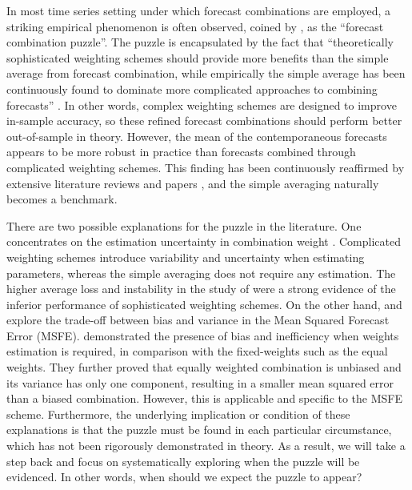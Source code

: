 \documentclass{monashthesis}
\begin{document}
In most time series setting under which forecast combinations are employed, a striking empirical phenomenon is often observed, coined by \textcite{SW04}, as the ``forecast combination puzzle''. The puzzle is encapsulated by the fact that ``theoretically sophisticated weighting schemes should provide more benefits than the simple average from forecast combination, while empirically the simple average has been continuously found to dominate more complicated approaches to combining forecasts'' \autocite{WHLK22}. In other words, complex weighting schemes are designed to improve in-sample accuracy, so these refined forecast combinations should perform better out-of-sample in theory. However, the mean of the contemporaneous forecasts appears to be more robust in practice than forecasts combined through complicated weighting schemes. This finding has been continuously reaffirmed by extensive literature reviews and papers \autocites[e.g.,][]{C89,SW98,SW04,SW09,MSA18,MSA20}, and the simple averaging naturally becomes a benchmark.

There are two possible explanations for the puzzle in the literature. One concentrates on the estimation uncertainty in combination weight \autocite{SW98,SW04,SW09}. Complicated weighting schemes introduce variability and uncertainty when estimating parameters, whereas the simple averaging does not require any estimation. The higher average loss and instability in the study of \textcite{SW04} were a strong evidence of the inferior performance of sophisticated weighting schemes. On the other hand, \textcite{E11} and \textcite{CMVW16} explore the trade-off between bias and variance in the Mean Squared Forecast Error (MSFE). \textcite{CMVW16} demonstrated the presence of bias and inefficiency when weights estimation is required, in comparison with the fixed-weights such as the equal weights. They further proved that equally weighted combination is unbiased and its variance has only one component, resulting in a smaller mean squared error than a biased combination. However, this is applicable and specific to the MSFE scheme. Furthermore, the underlying implication or condition of these explanations is that the puzzle must be found in each particular circumstance, which has not been rigorously demonstrated in theory. As a result, we will take a step back and focus on systematically exploring when the puzzle will be evidenced. In other words, when should we expect the puzzle to appear?
\end{document}
